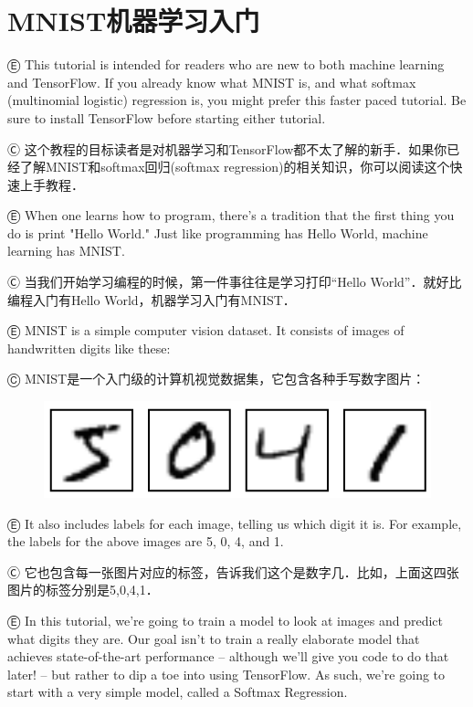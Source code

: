 


\newpage
\section {MNIST机器学习入门}\label{MINIST_beginner}

Ⓔ \textcolor{etc}{This tutorial is intended for readers who are new to both machine learning and TensorFlow. If you already know what MNIST is, and what softmax (multinomial logistic) regression is, you might prefer this faster paced tutorial. Be sure to install TensorFlow before starting either tutorial.}

Ⓒ 这个教程的目标读者是对机器学习和TensorFlow都不太了解的新手．如果你已经了解MNIST和softmax回归(softmax regression)的相关知识，你可以阅读这个快速上手教程．

Ⓔ \textcolor{etc}{When one learns how to program, there's a tradition that the first thing you do is print "Hello World." Just like programming has Hello World, machine learning has MNIST.}

Ⓒ 当我们开始学习编程的时候，第一件事往往是学习打印“Hello World”．就好比编程入门有Hello World，机器学习入门有MNIST．

Ⓔ \textcolor{etc}{MNIST is a simple computer vision dataset. It consists of images of handwritten digits like these:}

Ⓒ MNIST是一个入门级的计算机视觉数据集，它包含各种手写数字图片：

\begin{figure}[htbp]
\centering
\includegraphics[width=.55\textwidth]{../SOURCE/images/MNIST.png}
\caption{}
\end{figure}

Ⓔ \textcolor{etc}{It also includes labels for each image, telling us which digit it is. For example, the labels for the above images are 5, 0, 4, and 1.}

Ⓒ 它也包含每一张图片对应的标签，告诉我们这个是数字几．比如，上面这四张图片的标签分别是5,0,4,1．

Ⓔ \textcolor{etc}{In this tutorial, we're going to train a model to look at images and predict what digits they are. Our goal isn't to train a really elaborate model that achieves state-of-the-art performance -- although we'll give you code to do that later! -- but rather to dip a toe into using TensorFlow. As such, we're going to start with a very simple model, called a Softmax Regression.}

